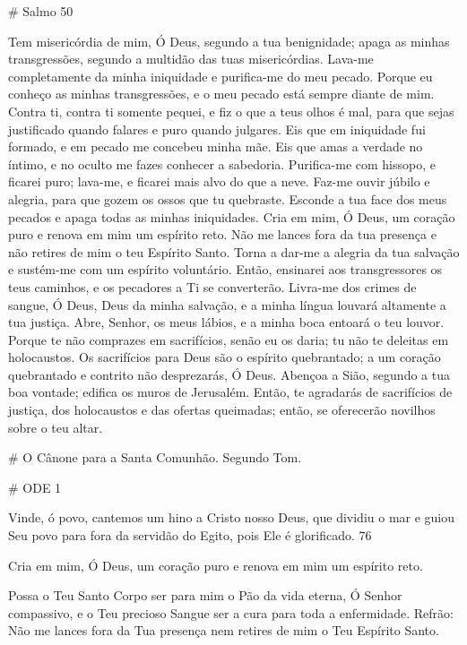 \documentclass{subfiles}
\begin{document}
# Salmo 50

Tem misericórdia de mim, Ó Deus, segundo a tua benignidade; apaga
as minhas transgressões, segundo a multidão das tuas misericórdias. Lava-me
completamente da minha iniquidade e purifica-me do meu pecado. Porque eu
conheço as minhas transgressões, e o meu pecado está sempre diante de mim.
Contra ti, contra ti somente pequei, e fiz o que a teus olhos é mal, para que
sejas justificado quando falares e puro quando julgares. Eis que em iniquidade
fui formado, e em pecado me concebeu minha mãe. Eis que amas a verdade
no íntimo, e no oculto me fazes conhecer a sabedoria. Purifica-me com
hissopo, e ficarei puro; lava-me, e ficarei mais alvo do que a neve. Faz-me ouvir
júbilo e alegria, para que gozem os ossos que tu quebraste. Esconde a tua face
dos meus pecados e apaga todas as minhas iniquidades. Cria em mim, Ó Deus,
um coração puro e renova em mim um espírito reto. Não me lances fora da
tua presença e não retires de mim o teu Espírito Santo. Torna a dar-me a
alegria da tua salvação e sustém-me com um espírito voluntário. Então,
ensinarei aos transgressores os teus caminhos, e os pecadores a Ti se
converterão. Livra-me dos crimes de sangue, Ó Deus, Deus da minha salvação,
e a minha língua louvará altamente a tua justiça. Abre, Senhor, os meus lábios,
e a minha boca entoará o teu louvor. Porque te não comprazes em sacrifícios,
senão eu os daria; tu não te deleitas em holocaustos. Os sacrifícios para Deus
são o espírito quebrantado; a um coração quebrantado e contrito não
desprezarás, Ó Deus. Abençoa a Sião, segundo a tua boa vontade; edifica os
muros de Jerusalém. Então, te agradarás de sacrifícios de justiça, dos
holocaustos e das ofertas queimadas; então, se oferecerão novilhos sobre o
teu altar.


# O Cânone para a Santa Comunhão. Segundo Tom.

# ODE 1

\eirmos{}Vinde, ó povo, cantemos um hino a Cristo nosso Deus, que dividiu o mar
e guiou Seu povo para fora da servidão do Egito, pois Ele é glorificado.
76

Cria em mim, Ó Deus, um coração puro e renova em mim um espírito reto.

Possa o Teu Santo Corpo ser para mim o Pão da vida eterna, Ó Senhor compassivo,
e o Teu precioso Sangue ser a cura para toda a enfermidade. Refrão: Não me
lances fora da Tua presença nem retires de mim o Teu Espírito Santo.
\end{document}
